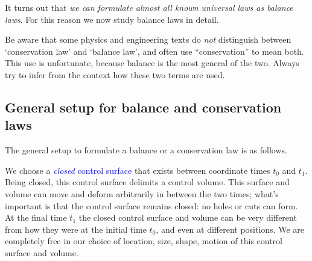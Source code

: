 \documentclass[a4paper,12pt,%
onecolumn,oneside,%
british%
]{memoir}
\renewcommand*{\|}[1][]{\nonscript\:#1\vert\nonscript\:\mathopen{}}
\newcommand*{\sect}{\S}%
\renewcommand*{\autoref}[2]{\sidepar{\vspace{-1ex}\footnotesize{\color{blue}\faIcon{%
angle-right%
}\enskip\sect~\ref{#1} page~\pageref{#1}}}\textcolor{blue}{#2}}
\newcommand*{\yti}{t_{0}}
\newcommand*{\ytf}{t_{1}}
\begin{document}
It turns out that \emph{we can formulate almost all known universal laws as balance laws}. For this reason we now study balance laws in detail.


\begin{warning}[\enquote*{Conservation} vs \enquote*{balance} in other texts,label={wa:conservation}]
  Be aware that some physics and engineering texts do \emph{not} distinguish between \enquote*{conservation law} and \enquote*{balance law}, and often use \enquote{conservation} to mean both. This use is unfortunate, because balance is the most general of the two. Always try to infer from the context how these two terms are used.
\end{warning}

\subsection{General setup for balance and conservation laws}
\label{sec:balance_setup}

The general setup to formulate a balance or a conservation law is as follows.

We choose a \autoref{sec:in_out_flux}{\emph{closed} control surface} that exists between coordinate times $\yti$ and $\ytf$. Being closed, this control surface delimits a control volume. This surface and volume can move and deform arbitrarily in between the two times; what's important is that the control surface remains closed: no holes or cuts can form. At the final time $\ytf$ the closed control surface and volume can be very different from how they were at the initial time $\yti$, and even at different positions. We are completely free in our choice of location, size, shape, motion of this control surface and volume.
\end{document}
